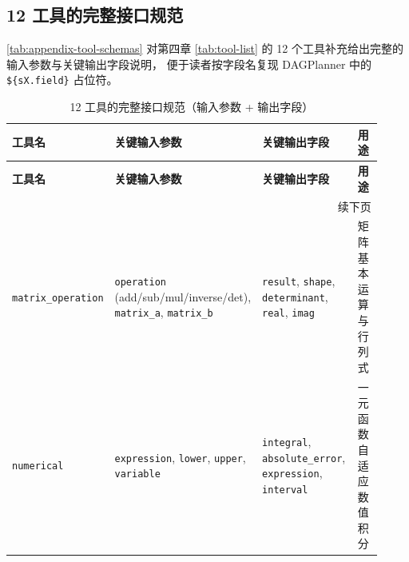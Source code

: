 \clearpage

{

    \appendixsubsecmajornumbering
    \subsection{12 工具的完整接口规范}
    
    \autoref{tab:appendix-tool-schemas}
    对第四章 \autoref{tab:tool-list} 的 12 个工具补充给出完整的输入参数与关键输出字段说明，
    便于读者按字段名复现 DAGPlanner 中的
    \verb|${sX.field}| 占位符。
    
    \small
    
    \begin{longtable}{
    p{0.18\linewidth}
    p{0.30\linewidth}
    p{0.30\linewidth}
    p{0.14\linewidth}
    }
    
    \caption{\label{tab:appendix-tool-schemas}
    12 工具的完整接口规范（输入参数 + 输出字段）}
    \\
    
    \toprule
    
    \textbf{工具名}
    &
    \textbf{关键输入参数}
    &
    \textbf{关键输出字段}
    &
    \textbf{用途}
    
    \\
    
    \midrule
    \endfirsthead
    
    \toprule
    
    \textbf{工具名}
    &
    \textbf{关键输入参数}
    &
    \textbf{关键输出字段}
    &
    \textbf{用途}
    
    \\
    
    \midrule
    \endhead
    
    \midrule
    \multicolumn{4}{r}{续下页}
    \\
    \endfoot
    
    \bottomrule
    \endlastfoot
    
    \texttt{matrix\_operation}
    &
    \texttt{operation}
    (add/sub/mul/inverse/det),
    \texttt{matrix\_a},
    \texttt{matrix\_b}
    &
    \texttt{result},
    \texttt{shape},
    \texttt{determinant},
    \texttt{real},
    \texttt{imag}
    &
    矩阵基本运算与行列式
    \\
    
    \texttt{numerical}
    &
    \texttt{expression},
    \texttt{lower},
    \texttt{upper},
    \texttt{variable}
    &
    \texttt{integral},
    \texttt{absolute\_error},
    \texttt{expression},
    \texttt{interval}
    &
    一元函数自适应数值积分
    \\
    

\end{longtable}}
